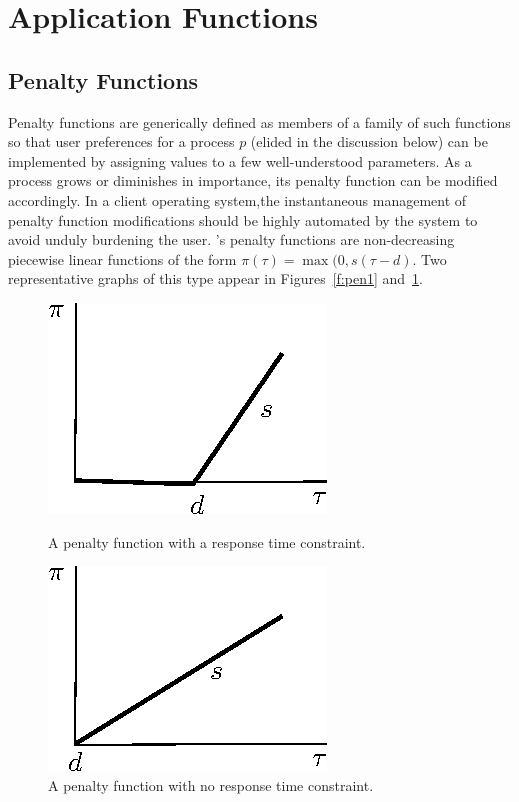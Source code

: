 \section{Application Functions}
\subsection*{Penalty Functions}

Penalty functions  are generically defined as members of a family of such functions
so that user preferences for a process $p$ (elided in the discussion below)
can be implemented by assigning values to a few well-understood parameters.
As a process grows or diminishes in importance, its penalty function can be modified accordingly.
In a client operating system,the instantaneous management of penalty function modifications
should be highly automated by the system to avoid unduly burdening the user.
\pacora's penalty functions are non-decreasing piecewise linear functions of the form
$\pi(\tau) = \max(0, s(\tau - d)$.
Two representative graphs of this type appear in Figures~\ref{f:pen1} and~\ref{f:pen2}.

\begin{figure}[hb]
\parbox{1.6in}{
\includegraphics*{Penalty1.eps}
\caption{\label{f:pen1}A penalty function with a response time constraint.}
}
\hspace{\fill}
\parbox{1.6in}{
\includegraphics*{Penalty2.eps}
\caption{\label{f:pen2}A penalty function with no response time constraint.}
}
\end{figure}

